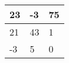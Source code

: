 \begin{table}[h]
\centering
\begin{tabular}{|l|l|l|}
\hline
23 & -3 & 75 \\ \hline
21 & 43 & 1  \\ \hline
-3 & 5  & 0  \\ \hline
\end{tabular}
\end{table}